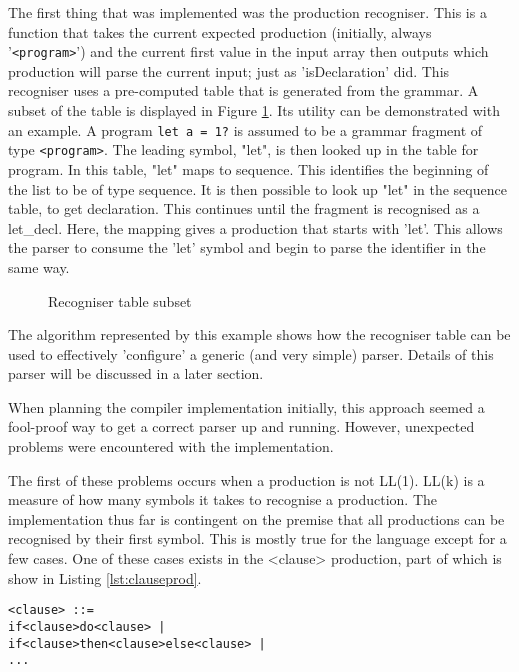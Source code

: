\documentclass{article}
\begin{document}
The first thing that was implemented was the production recogniser. This is a function that takes the current expected production (initially, always '\lstinline{<program>}') and the current first value in the input array then outputs which production will parse the current input; just as 'isDeclaration' did. This recogniser uses a pre-computed table that is generated from the grammar. A subset of the table is displayed in Figure \ref{fig:recogniserobj}. Its utility can be demonstrated with an example. A program \lstinline{let a = 1?} is assumed to be a grammar fragment of type \lstinline{<program>}. The leading symbol, "let", is then looked up in the table for \<program\>. In this table, "let" maps to \<sequence\>. This identifies the beginning of the list to be of type \<sequence\>. It is then possible to look up "let" in the \<sequence\> table, to get \<declaration\>. This continues until the fragment is recognised as a \<let_decl\>. Here, the mapping gives a production that starts with 'let'. This allows the parser to consume the 'let' symbol and begin to parse the \<identifier\> in the same way.

\begin{figure}[htbp]
  \centering
  
  \caption{Recogniser table subset}
  \label{fig:recogniserobj}
\end{figure}

The algorithm represented by this example shows how the recogniser table can be used to effectively 'configure' a generic (and very simple) parser. Details of this parser will be discussed in a later section.

When planning the compiler implementation initially, this approach seemed a fool-proof way to get a correct parser up and running. However, unexpected problems were encountered with the implementation.

The first of these problems occurs when a production is not LL(1). LL(k) is a measure of how many symbols it takes to recognise a production. The implementation thus far is contingent on the premise that all productions can be recognised by their first symbol. This is mostly true for the language except for a few cases. One of these cases exists in the <clause> production, part of which is show in Listing \ref{lst:clauseprod}. 

\begin{lstlisting}[caption={Fragment of the <clause> production},label={lst:clauseprod}]
<clause> ::=
if<clause>do<clause> |
if<clause>then<clause>else<clause> |
...
\end{lstlisting}
\end{document}
